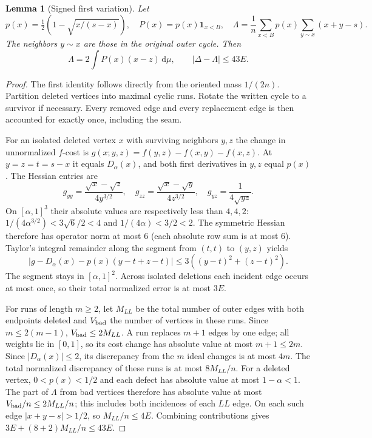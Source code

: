 \documentclass[11pt,a4paper]{article}
\newtheorem{lemma}[theorem]{Lemma}
\theoremstyle{remark}\newtheorem{remark}[theorem]{Remark}
\newcommand{\ind}{\mathbf 1}
\newcommand{\dd}{\,\mathrm d}
\begin{document}
\begin{lemma}[Signed first variation]\label{lem:variation}
Let
\[
p(x)=\tfrac12\left(1-\sqrt{x/(s-x)}\right),\quad
P(x)=p(x)\ind_{x<B},\quad
\Lambda=\frac1n\sum_{x<B}p(x)\sum_{y\sim x}(x+y-s).
\]
The neighbors $y\sim x$ are those in the original outer cycle. Then
\begin{equation}\label{eq:43}
\Lambda=2\int P(x)(x-z)\dd\mu,\qquad
|\Delta-\Lambda|\le43E.
\end{equation}
\end{lemma}
\begin{proof}
The first identity follows directly from the oriented mass $1/(2n)$.
Partition deleted vertices into maximal cyclic runs. Rotate the written
cycle to a survivor if necessary. Every removed edge and every replacement
edge is then accounted for exactly once, including the seam.

For an isolated deleted vertex $x$ with surviving neighbors $y,z$ the
change in unnormalized $f$-cost is
$g(x;y,z)=f(y,z)-f(x,y)-f(x,z)$. At $y=z=t=s-x$ it equals
$D_\alpha(x)$, and both first derivatives in $y,z$ equal $p(x)$.
The Hessian entries are
\[
g_{yy}=\frac{\sqrt{x}-\sqrt z}{4y^{3/2}},\quad
g_{zz}=\frac{\sqrt{x}-\sqrt y}{4z^{3/2}},\quad
g_{yz}=\frac1{4\sqrt{yz}}.
\]
On $[\alpha,1]^3$ their absolute values are respectively less than
$4,4,2$: $1/(4\alpha^{3/2})<3\sqrt6/2<4$ and
$1/(4\alpha)<3/2<2$. The symmetric Hessian therefore has operator
norm at most $6$ (each absolute row sum is at most $6$). Taylor's
integral remainder along the segment from $(t,t)$ to $(y,z)$ yields
\[
|g-D_\alpha(x)-p(x)(y-t+z-t)|
\le3((y-t)^2+(z-t)^2).
\]
The segment stays in $[\alpha,1]^2$. Across isolated deletions each
incident edge occurs at most once, so their total normalized error is
at most $3E$.

For runs of length $m\ge2$, let $M_{LL}$ be the total number of outer
edges with both endpoints deleted and $V_{\rm bad}$ the number of
vertices in these runs. Since $m\le2(m-1)$,
$V_{\rm bad}\le2M_{LL}$. A run replaces $m+1$ edges by one edge;
all weights lie in $[0,1]$, so its cost change has absolute value at
most $m+1\le2m$. Since $|D_\alpha(x)|\le2$, its discrepancy from
the $m$ ideal changes is at most $4m$. The total normalized discrepancy
of these runs is at most $8M_{LL}/n$.
For a deleted vertex, $0<p(x)<1/2$ and each defect has absolute value
at most $1-\alpha<1$. The part of $\Lambda$ from bad vertices therefore
has absolute value at most $V_{\rm bad}/n\le2M_{LL}/n$; this includes
both incidences of each $LL$ edge. On each such edge
$|x+y-s|>1/2$, so $M_{LL}/n\le4E$. Combining contributions gives
$3E+(8+2)M_{LL}/n\le43E$.
\end{proof}
\end{document}
